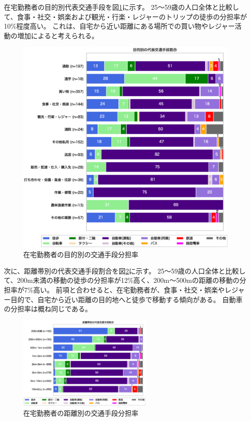 \documentclass[a4paper,12pt, uplatex]{jsbook}
\begin{document}
\clearpage
在宅勤務者の目的別代表交通手段を図\ref{fig:mode_share_purpose_remote}に示す。
25〜59歳の人口全体と比較して、食事・社交・娯楽および観光・行楽・レジャーのトリップの徒歩の分担率が10\%程度高い。
これは、自宅から近い距離にある場所での買い物やレジャー活動の増加によると考えられる。
%
\begin{figure}[H]
    \centering
    \includegraphics[width=1.0\textwidth]{picture/mode_share_purpose_在宅.eps}
    \caption{在宅勤務者の目的別の交通手段分担率}
    \label{fig:mode_share_purpose_remote}
\end{figure}

\clearpage
次に、距離帯別の代表交通手段割合を図\ref{fig:mode_share_dist_remote}に示す。
25〜59歳の人口全体と比較して、200m未満の移動の徒歩の分担率が12\%高く、200m〜500mの距離の移動の分担率が7\%高い。
前項と合わせると、在宅勤務者が、食事・社交・娯楽やレジャー目的で、自宅から近い距離の目的地へと徒歩で移動する傾向がある。
自動車の分担率は概ね同じである。
%
\begin{figure}[H]
    \centering
    \includegraphics[width=0.6\textwidth]{picture/mode_share_distance_在宅.eps}
    \caption{在宅勤務者の距離別の交通手段分担率}
    \label{fig:mode_share_dist_remote}
\end{figure}
\end{document}
